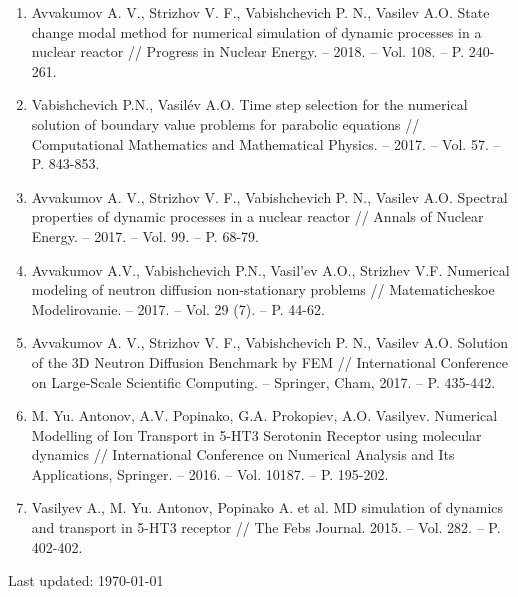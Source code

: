 \documentclass[a4paper]{article}
\def\footerlink{}
\begin{document}
\begin{enumerate}
\item Avvakumov A. V., Strizhov V. F., Vabishchevich P. N., Vasilev A.O. State change modal method for numerical simulation of dynamic processes in a nuclear reactor // Progress in Nuclear Energy. -- 2018. -- Vol. 108. -- P. 240-261.

\item Vabishchevich P.N., Vasil\' ev A.O. Time step selection for the numerical solution of boundary value problems for parabolic equations // Computational Mathematics and Mathematical Physics. -- 2017. -- Vol. 57. -- P. 843-853.

\item Avvakumov A. V., Strizhov V. F., Vabishchevich P. N., Vasilev A.O. Spectral properties of dynamic processes in a nuclear reactor // Annals of Nuclear Energy. -- 2017.  -- Vol. 99.  -- P. 68-79.

\item Avvakumov A.V., Vabishchevich P.N., Vasil'ev A.O., Strizhev V.F. Numerical modeling of neutron diffusion non-stationary problems // Matematicheskoe Modelirovanie. --  2017. --  Vol. 29 (7). -- P. 44-62.

\item Avvakumov A. V., Strizhov V. F., Vabishchevich P. N., Vasilev A.O. Solution of the 3D Neutron Diffusion Benchmark by FEM // International Conference on Large-Scale Scientific Computing. -- Springer, Cham, 2017. -- P. 435-442.

\item M. Yu. Antonov, A.V. Popinako, G.A. Prokopiev, A.O. Vasilyev.  Numerical Modelling of Ion Transport in 5-HT3 Serotonin Receptor using molecular dynamics // International Conference on Numerical Analysis and Its Applications, Springer. -- 2016. -- Vol. 10187. -- P. 195-202.

\item Vasilyev A., M. Yu. Antonov, Popinako A. et al. MD simulation of dynamics and transport in 5-HT3 receptor // The Febs Journal. 2015. -- Vol. 282. -- P. 402-402.





\end{enumerate}


\bigskip

\begin{center}
  \begin{footnotesize}
    Last updated: \today \\
    \href{\footerlink}{\texttt{\footerlink}}
  \end{footnotesize}
\end{center}
\end{document}
